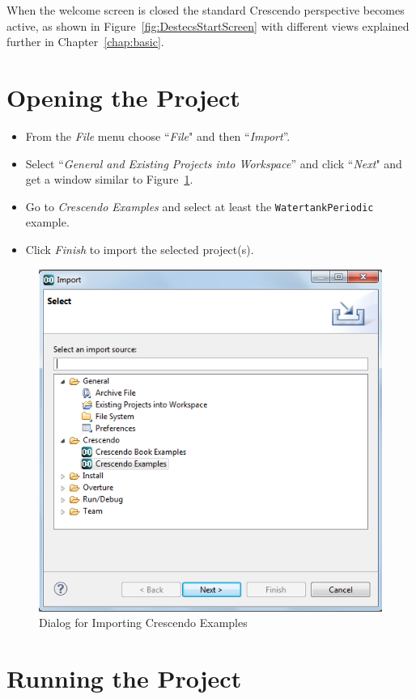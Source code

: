 \documentclass{crescendorepchap}
\begin{document}
When the welcome screen is closed the standard Crescendo perspective becomes active, as shown in Figure~\ref{fig:DestecsStartScreen} with different views explained further in Chapter~\ref{chap:basic}.

\section{Opening the Project}

\begin{itemize}
\item
  From the \emph{File} menu choose ``\emph{File}" and then ``\emph{Import}''.
\item
  Select ``\emph{General and Existing Projects into Workspace}''
  and click ``\emph{Next}" and get a window similar to Figure~\ref{fig:importex}.
\item
 Go to  \emph{Crescendo Examples} and select at least the
  \texttt{WatertankPeriodic} example.
\item
  Click \emph{Finish} to import the selected project(s).
\end{itemize}

\begin{figure}[htbp]
\centering
\includegraphics[width=.8\textwidth]{images/DestecsImportDialog.png}
\caption{Dialog for Importing Crescendo Examples\label{fig:importex}}
\end{figure}

\section{Running the Project}
\end{document}
